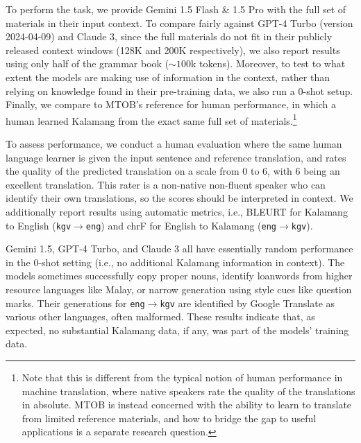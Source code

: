 To perform the task, we provide Gemini 1.5 Flash \& 1.5 Pro with the full set of materials in their input context. To compare fairly against GPT-4 Turbo (version 2024-04-09) and Claude 3, since the full materials do not fit in their publicly released context windows (128K and 200K respectively), we also report results using only half of the grammar book (${\sim}100$k tokens). Moreover, to test to what extent the models are making use of information in the context, rather than relying on knowledge found in their pre-training data, we also run a 0-shot setup. Finally, we compare to MTOB’s reference for human performance, in which a human learned Kalamang from the exact same full set of materials.\footnote{Note that this is different from the typical notion of human performance in machine translation, where native speakers rate the quality of the translations in absolute. MTOB is instead concerned with the ability to learn to translate from limited reference materials, and how to bridge the gap to useful applications is a separate research question. }

To assess performance, we conduct a human evaluation where the same human language learner is given the input sentence and reference translation, and rates the quality of the predicted translation on a scale from 0 to 6, with 6 being an excellent translation. This rater is a non-native non-fluent speaker who can identify their own translations, so the scores should be interpreted in context. We additionally report results using automatic metrics, i.e., BLEURT \cite{sellam-etal-2020-bleurt} for Kalamang to English (\texttt{kgv}$\rightarrow$\texttt{eng}) and chrF \cite{popovic-2015-chrf} for English to Kalamang (\texttt{eng}$\rightarrow$\texttt{kgv}).

Gemini 1.5, GPT-4 Turbo, and Claude 3 all have essentially random performance in the 0-shot setting (i.e., no additional Kalamang information in context). The models sometimes successfully copy proper nouns, identify loanwords from higher resource languages like Malay, or narrow generation using style cues like question marks. Their generations for \texttt{eng}$\rightarrow$\texttt{kgv} are identified by Google Translate as various other languages, often malformed. These results indicate that, as expected, no substantial Kalamang data, if any, was part of the models' training data.

